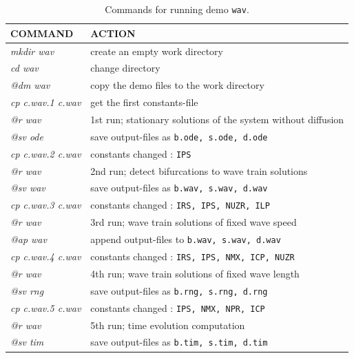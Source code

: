 \documentclass[12pt]{report}
\begin{document}
\begin{table}[htbp]
\begin{center}
\begin{tabular}{| l | l |}
\hline
  COMMAND  & ACTION \\
\hline
  {\it mkdir wav} & create an empty work directory \\ 
  {\it cd wav} & change directory \\
  {\it @dm wav} & copy the demo files to the work directory \\
\hline
  {\it cp c.wav.1 c.wav} & get the first constants-file \\ 
  {\it @r wav} & 1st run; stationary solutions of the system without diffusion \\ 
  {\it @sv ode} & save output-files as {\tt b.ode, s.ode, d.ode} \\ 
\hline
  {\it cp c.wav.2 c.wav} & constants changed : {\tt IPS} \\ 
  {\it @r wav} & 2nd run; detect bifurcations to wave train solutions \\ 
  {\it @sv wav} & save output-files as {\tt b.wav, s.wav, d.wav} \\ 
\hline
  {\it cp c.wav.3 c.wav} & constants changed : {\tt IRS, IPS, NUZR, ILP} \\ 
  {\it @r wav} & 3rd run; wave train solutions of fixed wave speed \\ 
  {\it @ap wav} & append output-files to {\tt b.wav, s.wav, d.wav} \\ 
\hline
  {\it cp c.wav.4 c.wav} & constants changed : {\tt IRS, IPS, NMX, ICP, NUZR} \\ 
  {\it @r wav} & 4th run; wave train solutions of fixed wave length \\ 
  {\it @sv rng} & save output-files as {\tt b.rng, s.rng, d.rng} \\ 
\hline
  {\it cp c.wav.5 c.wav} & constants changed : {\tt IPS, NMX, NPR, ICP} \\ 
  {\it @r wav} & 5th run; time evolution computation \\ 
  {\it @sv tim} & save output-files as {\tt b.tim, s.tim, d.tim} \\ 
\hline
\end{tabular}
\caption{Commands for running demo {\tt wav}.}
\label{tbl:demo_wav}
\end{center}
\end{table}
\end{document}
